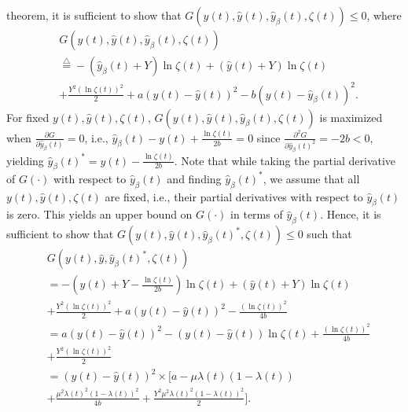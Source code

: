 \documentclass[journal]{IEEEtran}
\newcommand{\nn}{\nonumber}
\newcommand{\defi}{\stackrel{\bigtriangleup}{=}}
\begin{document}
theorem, it is sufficient to show that
$G(y(t),\hat{y}(t),\hat{y}_{\beta}(t),\zeta(t))\leq 0$, where
\begin{align}
&G(y(t),\hat{y}(t),\hat{y}_{\beta}(t),\zeta(t)) \nn\\
& \defi -(\hat{y}_{\beta}(t) + Y)\ln \zeta(t) +  (\hat{y}(t)+ Y) \ln\zeta(t)  \nn \\ & +\frac{Y^2 (\ln \zeta(t))^2}{2}
                                        + a(y(t)-\hat{y}(t))^2 - b(y(t)-\hat{y}_{\beta}(t))^2.\label{main_func}
\end{align}\normalsize
For fixed $y(t),\hat{y}(t),\zeta(t)$,
$G(y(t),\hat{y}(t),\hat{y}_{\beta}(t),\zeta(t))$ is maximized when
$\frac{\partial G}{\partial {\hat{y}_{\beta}(t)}}=0$, i.e.,
$ \hat{y}_{\beta}(t) -
y(t)+ \frac{\ln \zeta(t)}{2b} = 0$
since $\frac{\partial^2 G}{\partial {\hat{y}_{\beta}(t)}^2} = -2b < 0$,
yielding $
{\hat{y}_{\beta}(t)}^* = y(t)- \frac{\ln \zeta(t)}{2b}$.
Note that while taking the partial derivative of $G(\cdot)$ with
respect to $\hat{y}_{\beta}(t)$ and finding ${\hat{y}_{\beta}(t)}^*$, we assume
that all $y(t),\hat{y}(t),\zeta(t)$ are fixed, i.e., their partial
derivatives with respect to $\hat{y}_{\beta}(t)$ is zero. This yields an
upper bound on $G(\cdot)$ in terms of $\hat{y}_{\beta}(t)$. Hence, it is
sufficient to show that $G(y(t),\hat{y}(t),{\hat{y}_{\beta}(t)}^*,\zeta(t))
\leq 0$ such that \cite{KiWa02}
\begin{align}
& G(y(t),\hat{y},{\hat{y}_{\beta}(t)}^*,\zeta(t)) \nonumber \\
& = - \left(y(t)+ Y - \frac{\ln \zeta(t)}{2b}\right) \ln \zeta(t) +   (\hat{y}(t)+ Y) \ln\zeta(t) \nonumber \\
& +\frac{Y^2 (\ln \zeta(t))^2}{2}  + a(y(t)-\hat{y}(t))^2 - \frac{(\ln \zeta(t) )^2}{4b}\label{eq:ust1} \\
& = a (y(t)-\hat{y}(t))^2 - (y(t)-\hat{y}(t))\ln \zeta(t) + \frac{(\ln \zeta(t))^2}{4b} \nn \\
&+ \frac{Y^2 (\ln \zeta(t))^2}{2}\nonumber\\
& = (y(t) - \hat{y}(t))^2\times \Bigg[  a - \mu\lambda(t)(1-\lambda(t))   \nn \\
&+\frac{{\mu}^2{\lambda(t)}^2 (1-\lambda(t))^2}{4b} + \frac{Y^2 {\mu}^2 {\lambda(t)}^2 (1-\lambda(t))^2}{2} \Bigg]. \label{eq:last}
\end{align}\normalsize
\end{document}

